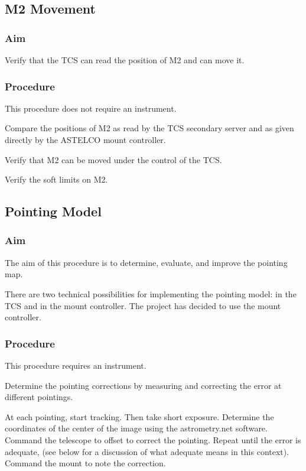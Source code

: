 \documentclass{article}
\begin{document}
\subsection{M2 Movement}

\subsubsection{Aim}

Verify that the TCS can read the position of M2 and can move it.

\subsubsection{Procedure}

This procedure does not require an instrument.

Compare the positions of M2 as read by the TCS secondary server and as given directly by the ASTELCO mount controller.

Verify that M2 can be moved under the control of the TCS.

Verify the soft limits on M2.


\subsection{Pointing Model}

\subsubsection{Aim}

The aim of this procedure is to determine, evaluate, and improve the pointing map.

There are two technical possibilities for implementing the pointing model: in the TCS and in the mount controller. The project has decided to use the mount controller.

\subsubsection{Procedure}

This procedure requires an instrument.

Determine the pointing corrections by measuring and correcting the error at different pointings. 

At each pointing, start tracking. Then take short exposure. Determine the coordinates of the center of the image using the astrometry.net software. Command the telescope to offset to correct the pointing. Repeat until the error is adequate, (see below for a discussion of what adequate means in this context). Command the mount to note the correction. 
\end{document}

